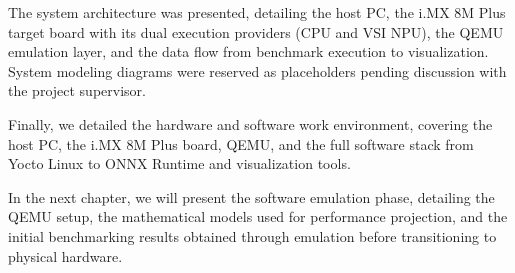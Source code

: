 The system architecture was presented, detailing the host PC, the i.MX 8M Plus target board with its dual execution providers (CPU and VSI NPU), the QEMU emulation layer, and the data flow from benchmark execution to visualization. System modeling diagrams were reserved as placeholders pending discussion with the project supervisor.

Finally, we detailed the hardware and software work environment, covering the host PC, the i.MX 8M Plus board, QEMU, and the full software stack from Yocto Linux to ONNX Runtime and visualization tools.

In the next chapter, we will present the software emulation phase, detailing the QEMU setup, the mathematical models used for performance projection, and the initial benchmarking results obtained through emulation before transitioning to physical hardware.